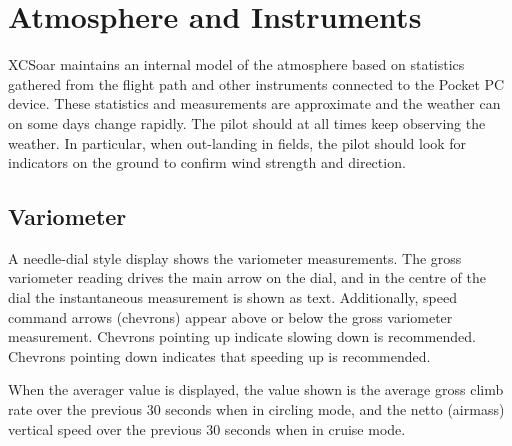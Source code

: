 \chapter{Atmosphere and Instruments}\label{cha:atmosph}
XCSoar maintains an internal model of the atmosphere based on
statistics gathered from the flight path and other instruments
connected to the Pocket PC device.  These statistics and measurements
are approximate and the weather can on some days change rapidly.  The
pilot should at all times keep observing the weather.  In
particular, when out-landing in fields, the pilot should look for
indicators on the ground to confirm wind strength and direction.

\section{Variometer}\label{sec:variometer}

A needle-dial style display shows the variometer measurements.  The
gross variometer reading drives the main arrow on the dial, and in the
centre of the dial the instantaneous measurement is shown as text.
Additionally, speed command arrows (chevrons) appear above or below
the gross variometer measurement.  Chevrons pointing up indicate
slowing down is recommended.  Chevrons pointing down indicates that
speeding up is recommended.  

When the averager value is displayed, the value shown is the average
gross climb rate over the previous 30 seconds when in circling mode,
and the netto (airmass) vertical speed over the previous 30 seconds
when in cruise mode.


